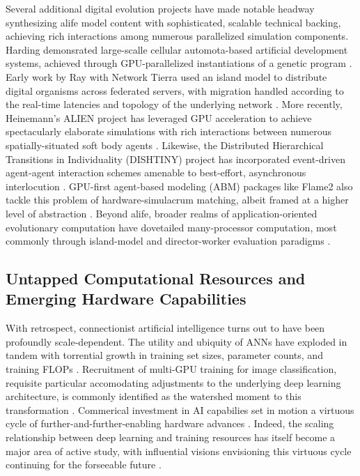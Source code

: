 Several additional digital evolution projects have made notable headway synthesizing alife model content with sophisticated, scalable technical backing, achieving rich interactions among numerous parallelized simulation components.
Harding demonsrated large-scalle cellular automota-based artificial development systems, achieved through GPU-parallelized instantiations of a genetic program  \citep{harding2007fast_ieee}.
Early work by Ray with Network Tierra used an island model to distribute digital organisms across federated servers, with migration  handled according to the real-time latencies and topology of the underlying network \citep{ray1995proposal}.
More recently, Heinemann's ALIEN project has leveraged GPU acceleration to achieve spectacularly elaborate simulations with rich interactions between numerous spatially-situated soft body agents \citep{heinemann2008artificial}.
Likewise, the Distributed Hierarchical Transitions in Individuality (DISHTINY) project has incorporated event-driven agent-agent interaction schemes amenable to best-effort, asynchronous interlocution \citep{TODO,TODOconduit}.
GPU-first agent-based modeling (ABM) packages like Flame2 also tackle this problem of hardware-simulacrum matching, albeit framed at a higher level of abstraction \citep{TODO}.
Beyond alife, broader realms of application-oriented evolutionary computation have dovetailed many-processor computation, most commonly through island-model and director-worker evaluation paradigms \citep{TODO}.

\subsection{Untapped Computational Resources and Emerging Hardware Capabilities}

With retrospect, connectionist artificial intelligence turns out to have been profoundly scale-dependent.
The utility and ubiquity of ANNs have exploded in tandem with torrential growth in training set sizes, parameter counts, and training FLOPs \citep{marcus2018deep}.
Recruitment of multi-GPU training for image classification, requisite particular accomodating adjustments to the underlying deep learning architecture, is commonly identified as the watershed moment to this transformation
 \citep{krizhevsky2012imagenet}.
Commerical investment in AI capabilies set in motion a virtuous cycle of further-and-further-enabling hardware advances \citep{jouppi2017datacenter}.
Indeed, the scaling relationship between deep learning and training resources has itself become a major area of active study, with influential visions envisioning this virtuous cycle continuing for the forseeable future \citep{CITETODOTHATGOOGLEPAPERPREPRINT}.

